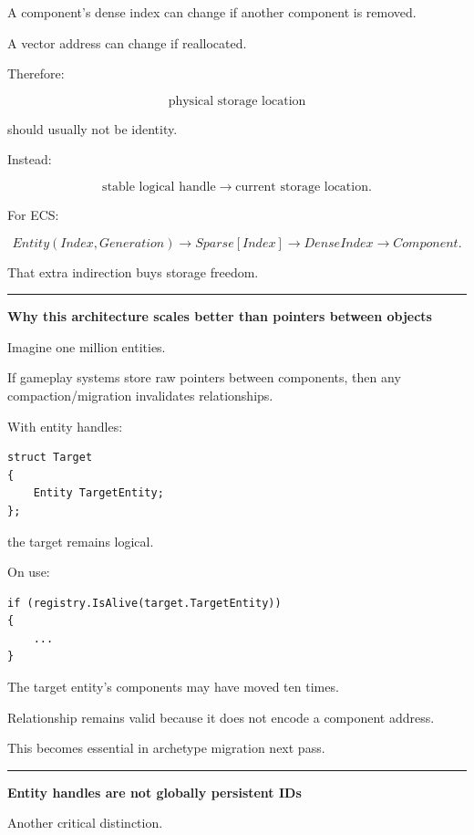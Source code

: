 A component's dense index can change if another component is removed.

A vector address can change if reallocated.

Therefore:

\[
\text{physical storage location}
\]

should usually not be identity.

Instead:

\[
\text{stable logical handle}
\rightarrow
\text{current storage location}.
\]

For ECS:

\[
Entity(Index,Generation)
\rightarrow
Sparse[Index]
\rightarrow
DenseIndex
\rightarrow
Component.
\]

That extra indirection buys storage freedom.

\begin{center}\rule{0.5\linewidth}{0.5pt}\end{center}

\textbf{Why this architecture scales better than pointers between objects}

Imagine one million entities.

If gameplay systems store raw pointers between components, then any compaction/migration invalidates relationships.

With entity handles:

\begin{verbatim}
struct Target
{
    Entity TargetEntity;
};
\end{verbatim}

the target remains logical.

On use:

\begin{verbatim}
if (registry.IsAlive(target.TargetEntity))
{
    ...
}
\end{verbatim}

The target entity's components may have moved ten times.

Relationship remains valid because it does not encode a component address.

This becomes essential in archetype migration next pass.

\begin{center}\rule{0.5\linewidth}{0.5pt}\end{center}

\textbf{Entity handles are not globally persistent IDs}

Another critical distinction.


